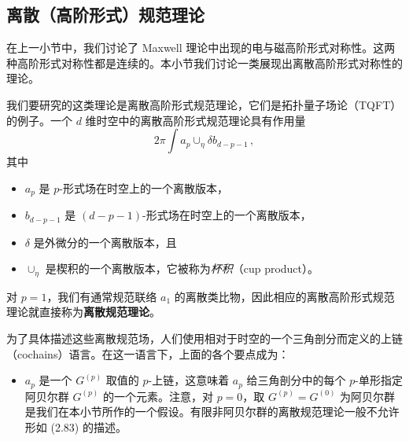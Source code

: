 
\subsection{离散（高阶形式）规范理论}

在上一小节中，我们讨论了 Maxwell 理论中出现的电与磁高阶形式对称性。这两种高阶形式对称性都是连续的。本小节我们讨论一类展现出离散高阶形式对称性的理论。

我们要研究的这类理论是离散高阶形式规范理论，它们是拓扑量子场论（TQFT）的例子。一个 $d$ 维时空中的离散高阶形式规范理论具有作用量
\begin{equation}
  2\pi\int a_p\cup_\eta\delta b_{d-p-1}\,, \tag{2.83}
\end{equation}
其中
\begin{itemize}[leftmargin=1.4em,itemsep=1pt,topsep=1pt]
\item $a_p$ 是 $p$-形式场在时空上的一个离散版本，
\item $b_{d-p-1}$ 是 $(d-p-1)$-形式场在时空上的一个离散版本，
\item $\delta$ 是外微分的一个离散版本，且
\item $\cup_\eta$ 是楔积的一个离散版本，它被称为\emph{杯积}（cup product）。
\end{itemize}
对 $p=1$，我们有通常规范联络 $a_1$ 的离散类比物，因此相应的离散高阶形式规范理论就直接称为\textbf{离散规范理论}。

 为了具体描述这些离散规范场，人们使用相对于时空的一个三角剖分而定义的上链（cochains）语言。在这一语言下，上面的各个要点成为：

\begin{itemize}[leftmargin=1.4em,itemsep=1pt,topsep=1pt]
\item $a_p$ 是一个 $G^{(p)}$ 取值的 $p$-上链，这意味着 $a_p$ 给三角剖分中的每个 $p$-单形指定阿贝尔群 $G^{(p)}$ 的一个元素。注意，对 $p=0$，取 $G^{(p)}=G^{(0)}$ 为阿贝尔群是我们在本小节所作的一个假设。有限非阿贝尔群的离散规范理论一般不允许形如 (2.83) 的描述。
\end{itemize}
